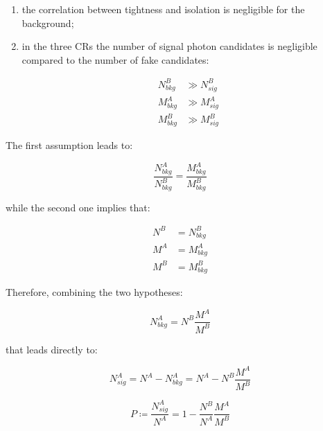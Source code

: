 \documentclass[11pt,a4paper,twoside,openright]{book}
\begin{document}
\begin{enumerate}

    \item the correlation between tightness and isolation is negligible for the background;
    
    \item in the three CRs the number of signal photon candidates is negligible compared to the number of fake candidates:
    
    \begin{equation}
    \begin{aligned}
        N^{B}_{bkg} & \gg N^{B}_{sig}\\
        M^{A}_{bkg} & \gg M^{A}_{sig}\\
        M^{B}_{bkg} & \gg M^{B}_{sig}
    \end{aligned}
    \end{equation}
    
    
    
\end{enumerate}

The first assumption leads to:

\begin{equation} \label{eq:correlation_factor_1}
    \frac{N^{A}_{bkg}}{N^{B}_{bkg}} = \frac{M^{A}_{bkg}}{M^{B}_{bkg}}
\end{equation}



while the second one implies that:

\begin{equation}
\begin{aligned}
    N^{B} & = N^{B}_{bkg}\\
    M^{A} & = M^{A}_{bkg}\\
    M^{B} & = M^{B}_{bkg}
\end{aligned}
\end{equation}

Therefore, combining the two hypotheses:

\begin{equation}
    N^{A}_{bkg} = N^{B} \frac{M^{A}}{M^{B}}
\end{equation}

that leads directly to:

\begin{equation} \label{eq:Nasig}
    N^{A}_{sig} = N^{A} - N^{A}_{bkg} = N^{A} - N^{B} \frac{M^{A}}{M^{B}}
\end{equation}

\begin{equation}
    P \coloneqq \frac{N^{A}_{sig}}{N^{A}} = 1 - \frac{N^{B}}{N^{A}} \frac{M^{A}}{M^{B}}
\end{equation}{}
\end{document}
